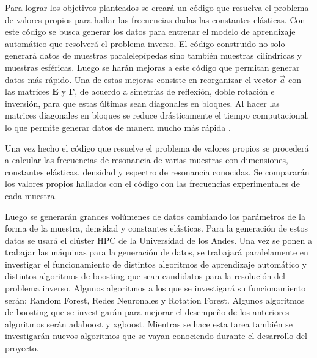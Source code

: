 \documentclass[12pt]{article}
\begin{document}


Para lograr los objetivos planteados se creará un código que resuelva el problema de valores propios para hallar las frecuencias dadas las constantes elásticas. Con este código se busca generar los datos para entrenar el modelo de aprendizaje automático que resolverá el problema inverso. El código construido  no solo generará datos de muestras paralelepípedas sino también muestras cilíndricas y muestras esféricas. Luego se harán mejoras a este código que permitan generar datos más rápido. Una de estas mejoras consiste en reorganizar el vector $\vec{a}$ con las matrices $\bm{E}$ y $\bm{\Gamma}$, de acuerdo a simetrías de reflexión, doble rotación e inversión, para que estas últimas sean diagonales en bloques. Al hacer las matrices diagonales en bloques se reduce drásticamente el tiempo computacional, lo que permite generar datos de manera mucho más rápida \cite{Leisure_1997}. 

Una vez hecho el código que resuelve el problema de valores propios se procederá a calcular las frecuencias de resonancia de varias muestras con dimensiones, constantes elásticas, densidad y espectro de resonancia conocidas. Se compararán los valores propios hallados con el código con las frecuencias experimentales de cada muestra. 

Luego se generarán grandes volúmenes de datos cambiando los parámetros de la forma de la muestra, densidad y constantes elásticas. Para la generación de estos datos se usará el clúster HPC de la Universidad de los Andes. Una vez se ponen a trabajar las máquinas para la generación de datos, se trabajará paralelamente en investigar el funcionamiento de distintos algoritmos de aprendizaje automático y distintos algoritmos de boosting que sean candidatos para la resolución del problema inverso. Algunos algoritmos a los que se investigará su funcionamiento serán: Random Forest, Redes Neuronales y Rotation Forest. Algunos algoritmos de boosting que se investigarán para mejorar el desempeño de los anteriores algoritmos serán adaboost y xgboost. Mientras se hace esta tarea también se investigarán nuevos algoritmos que se vayan conociendo durante el desarrollo del proyecto. 
\end{document}
